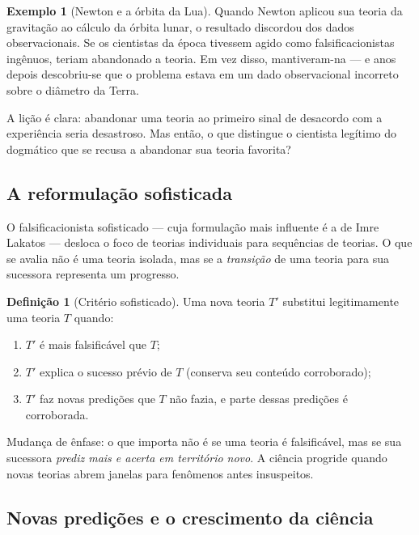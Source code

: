 \documentclass[9pt,a4paper]{extarticle}
\newcommand{\impt}[1]{\textcolor{important}{#1}}
\newcommand{\ntc}[1]{\textcolor{notice}{#1}}
\theoremstyle{definition}
\newtheorem{definition}{Definição}[section]
\newtheorem{example}{Exemplo}[section]
\begin{document}
\begin{example}[Newton e a órbita da Lua]
Quando Newton aplicou sua teoria da gravitação ao cálculo da órbita lunar, o resultado discordou dos dados observacionais. Se os cientistas da época tivessem agido como falsificacionistas ingênuos, teriam abandonado a teoria. Em vez disso, mantiveram-na --- e anos depois descobriu-se que o problema estava em um dado observacional incorreto sobre o diâmetro da Terra.
\end{example}

A lição é clara: abandonar uma teoria ao primeiro sinal de desacordo com a experiência seria desastroso. Mas então, o que distingue o cientista legítimo do dogmático que se recusa a abandonar sua teoria favorita?

\subsection{A reformulação sofisticada}

O falsificacionista sofisticado --- cuja formulação mais influente é a de Imre Lakatos --- desloca o foco de teorias individuais para \impt{sequências de teorias}. O que se avalia não é uma teoria isolada, mas se a \emph{transição} de uma teoria para sua sucessora representa um progresso.

\begin{definition}[Critério sofisticado]
Uma nova teoria $T'$ substitui legitimamente uma teoria $T$ quando:
\begin{enumerate}
  \item $T'$ é \impt{mais falsificável} que $T$;
  \item $T'$ explica o sucesso prévio de $T$ (conserva seu conteúdo corroborado);
  \item $T'$ faz \impt{novas predições} que $T$ não fazia, e parte dessas predições é \impt{corroborada}.
\end{enumerate}
\end{definition}

\ntc{Mudança de ênfase:} o que importa não é se uma teoria é falsificável, mas se sua sucessora \emph{prediz mais e acerta em território novo}. A ciência progride quando novas teorias abrem janelas para fenômenos antes insuspeitos.

\subsection{Novas predições e o crescimento da ciência}
\end{document}

